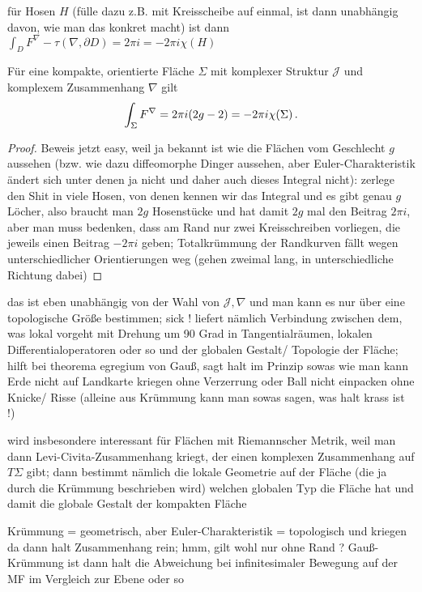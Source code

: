 für Hosen $H$ (fülle dazu z.B. mit Kreisscheibe auf einmal, ist dann unabhängig davon, wie man das konkret macht) ist dann $\int_D F^\nabla - \tau(\nabla, \partial D) = 2\pi i = -2\pi i \chi(H)$


\begin{satz}
Für eine kompakte, orientierte Fläche $\Sigma$ mit komplexer Struktur $\mathcal{J}$ und komplexem Zusammenhang $\nabla$ gilt
\begin{equation}
\int_\Sigma F^\nabla = 2 \pi i \qty(2 g - 2) = - 2\pi i \chi(\Sigma) \, .
\end{equation}
\end{satz}
\begin{proof}
Beweis jetzt easy, weil ja bekannt ist wie die Flächen vom Geschlecht $g$ aussehen (bzw. wie dazu diffeomorphe Dinger aussehen, aber Euler-Charakteristik ändert sich unter denen ja nicht und daher auch dieses Integral nicht): zerlege den Shit in viele Hosen, von denen kennen wir das Integral und es gibt genau $g$ Löcher, also braucht man $2g$ Hosenstücke und hat damit $2g$ mal den Beitrag $2 \pi i$, aber man muss bedenken, dass am Rand nur zwei Kreisschreiben vorliegen, die jeweils einen Beitrag $-2 \pi i$ geben; Totalkrümmung der Randkurven fällt wegen unterschiedlicher Orientierungen weg (gehen zweimal lang, in unterschiedliche Richtung dabei)
\end{proof}
das ist eben unabhängig von der Wahl von $\mathcal{J}, \nabla$ und man kann es nur über eine topologische Größe bestimmen; sick ! liefert nämlich Verbindung zwischen dem, was lokal vorgeht mit Drehung um 90 Grad in Tangentialräumen, lokalen Differentialoperatoren oder so und der globalen Gestalt/ Topologie der Fläche; hilft bei theorema egregium von Gauß, sagt halt im Prinzip sowas wie man kann Erde nicht auf Landkarte kriegen ohne Verzerrung oder Ball nicht einpacken ohne Knicke/ Risse (alleine aus Krümmung kann man sowas sagen, was halt krass ist !)


wird insbesondere interessant für Flächen mit Riemannscher Metrik, weil man dann Levi-Civita-Zusammenhang kriegt, der einen komplexen Zusammenhang auf $T\Sigma$ gibt; dann bestimmt nämlich die lokale Geometrie auf der Fläche (die ja durch die Krümmung beschrieben wird) welchen globalen Typ die Fläche hat und damit die globale Gestalt der kompakten Fläche


Krümmung = geometrisch, aber Euler-Charakteristik = topologisch und kriegen da dann halt Zusammenhang rein; hmm, gilt wohl nur ohne Rand ? Gauß-Krümmung ist dann halt die Abweichung bei infinitesimaler Bewegung auf der MF im Vergleich zur Ebene oder so

